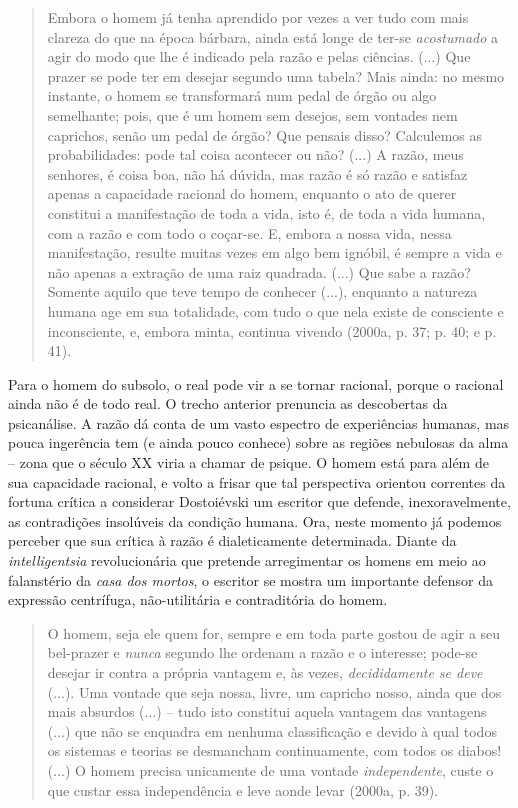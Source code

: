 \begin{quote}
Embora o homem já tenha aprendido por vezes a ver tudo com mais clareza
do que na época bárbara, ainda está longe de ter-se \emph{acostumado} a
agir do modo que lhe é indicado pela razão e pelas ciências. (...) Que
prazer se pode ter em desejar segundo uma tabela? Mais ainda: no mesmo
instante, o homem se transformará num pedal de órgão ou algo semelhante;
pois, que é um homem sem desejos, sem vontades nem caprichos, senão um
pedal de órgão? Que pensais disso? Calculemos as probabilidades: pode
tal coisa acontecer ou não? (...) A razão, meus senhores, é coisa boa,
não há dúvida, mas razão é só razão e satisfaz apenas a capacidade
racional do homem, enquanto o ato de querer constitui a manifestação de
toda a vida, isto é, de toda a vida humana, com a razão e com todo o
coçar-se. E, embora a nossa vida, nessa manifestação, resulte muitas
vezes em algo bem ignóbil, é sempre a vida e não apenas a extração de
uma raiz quadrada. (...) Que sabe a razão? Somente aquilo que teve tempo
de conhecer (...), enquanto a natureza humana age em sua totalidade, com
tudo o que nela existe de consciente e inconsciente, e, embora minta,
continua vivendo (2000a, p. 37; p. 40; e p. 41).
\end{quote}

Para o homem do subsolo, o real pode vir a se tornar racional, porque o
racional ainda não é de todo real. O trecho anterior prenuncia as
descobertas da psicanálise. A razão dá conta de um vasto espectro de
experiências humanas, mas pouca ingerência tem (e ainda pouco conhece)
sobre as regiões nebulosas da alma -- zona que o século XX viria a
chamar de psique. O homem está para além de sua capacidade racional, e
volto a frisar que tal perspectiva orientou correntes da fortuna crítica
a considerar Dostoiévski um escritor que defende, inexoravelmente, as
contradições insolúveis da condição humana. Ora, neste momento já
podemos perceber que sua crítica à razão é dialeticamente determinada.
Diante da \emph{intelligentsia} revolucionária que pretende arregimentar
os homens em meio ao falanstério da \emph{casa dos mortos}, o escritor
se mostra um importante defensor da expressão centrífuga, não-utilitária
e contraditória do homem.

\begin{quote}
O homem, seja ele quem for, sempre e em toda parte gostou de agir a seu
bel-prazer e \emph{nunca} segundo lhe ordenam a razão e o interesse;
pode-se desejar ir contra a própria vantagem e, às vezes,
\emph{decididamente se deve} (...). Uma vontade que seja nossa, livre,
um capricho nosso, ainda que dos mais absurdos (...) -- tudo isto
constitui aquela vantagem das vantagens (...) que não se enquadra em
nenhuma classificação e devido à qual todos os sistemas e teorias se
desmancham continuamente, com todos os diabos! (...) O homem precisa
unicamente de uma vontade \emph{independente}, custe o que custar essa
independência e leve aonde levar (2000a, p. 39).
\end{quote}

